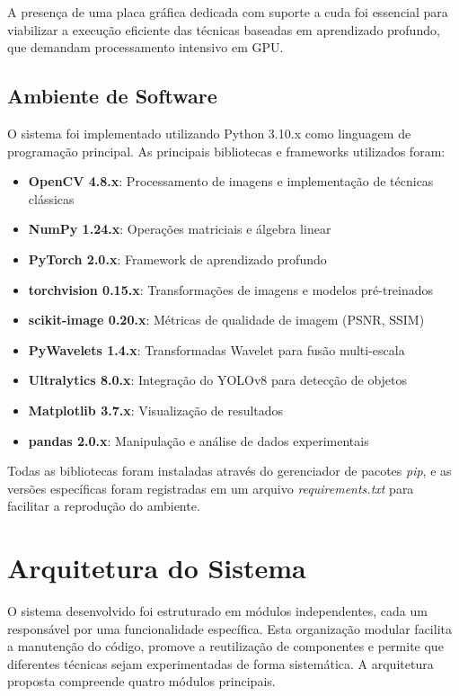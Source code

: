 A presença de uma placa gráfica dedicada com suporte a \gls{cuda} foi essencial para viabilizar a execução eficiente das técnicas baseadas em aprendizado profundo, que demandam processamento intensivo em GPU.

\subsection{Ambiente de Software}

O sistema foi implementado utilizando Python 3.10.x como linguagem de programação principal. As principais bibliotecas e frameworks utilizados foram:

\begin{itemize}
    \item \textbf{OpenCV 4.8.x}: Processamento de imagens e implementação de técnicas clássicas
    \item \textbf{NumPy 1.24.x}: Operações matriciais e álgebra linear
    \item \textbf{PyTorch 2.0.x}: Framework de aprendizado profundo
    \item \textbf{torchvision 0.15.x}: Transformações de imagens e modelos pré-treinados
    \item \textbf{scikit-image 0.20.x}: Métricas de qualidade de imagem (PSNR, SSIM)
    \item \textbf{PyWavelets 1.4.x}: Transformadas Wavelet para fusão multi-escala
    \item \textbf{Ultralytics 8.0.x}: Integração do YOLOv8 para detecção de objetos
    \item \textbf{Matplotlib 3.7.x}: Visualização de resultados
    \item \textbf{pandas 2.0.x}: Manipulação e análise de dados experimentais
\end{itemize}

Todas as bibliotecas foram instaladas através do gerenciador de pacotes \textit{pip}, e as versões específicas foram registradas em um arquivo \textit{requirements.txt} para facilitar a reprodução do ambiente.

\section{Arquitetura do Sistema}

O sistema desenvolvido foi estruturado em módulos independentes, cada um responsável por uma funcionalidade específica. Esta organização modular facilita a manutenção do código, promove a reutilização de componentes e permite que diferentes técnicas sejam experimentadas de forma sistemática. A arquitetura proposta compreende quatro módulos principais.

